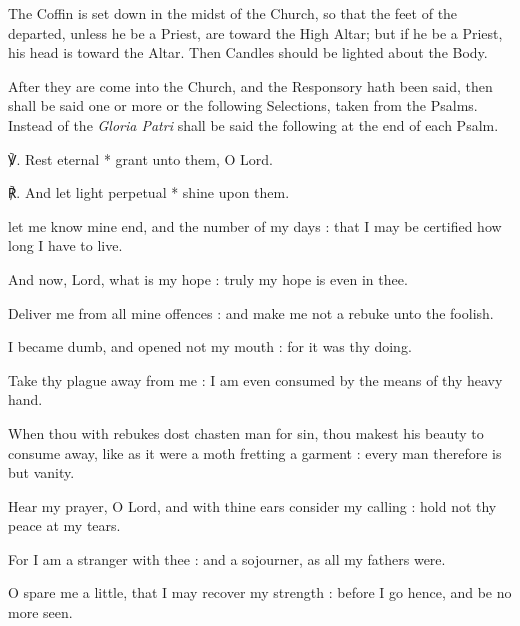 \begin{rubric}
	The Coffin is set down in the midst of the Church, so that the feet of the departed, unless he be a Priest, are toward the High Altar; but if he be a Priest, his head is toward the Altar. Then Candles should be lighted about the Body.
\end{rubric}

\begin{rubric}
    After they are come into the Church, and the Responsory hath been said, then shall be said one or more or the following Selections, taken from the Psalms. Instead of the \emph{Gloria Patri} shall be said the following at the end of each Psalm.
\end{rubric}
℣. Rest eternal * grant unto them, O Lord.\par
℟. And let light perpetual * shine upon them.\par\noindent

 let me know mine end, and the number of my days : that I may be certified how long I have to live.\par
{}
And now, Lord, what is my hope : truly my hope is even in thee.\par
{}Deliver me from all mine offences : and make me not a rebuke unto the foolish.\par
{}I became dumb, and opened not my mouth : for it was thy doing.\par
{}Take thy plague away from me : I am even consumed by the means of thy heavy hand.\par
{}When thou with rebukes dost chasten man for sin, thou makest his beauty to consume away, like as it were a moth fretting a garment : every man therefore is but vanity.\par
{}Hear my prayer, O Lord, and with thine ears consider my calling : hold not thy peace at my tears.\par
{}For I am a stranger with thee : and a sojourner, as all my fathers were.\par
{}O spare me a little, that I may recover my strength : before I go hence, and be no more seen.\par

